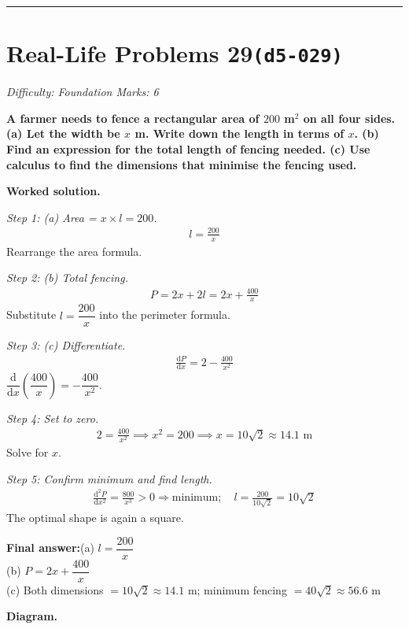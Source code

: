\documentclass[11pt]{article}
\newcommand{\question}[1]{\par\medskip\noindent\textbf{#1}\par}
\begin{document}
\medskip\hrule

\section*{Real-Life Problems 29\quad\small\texttt{(d5-029)}}
\textit{Difficulty: Foundation \quad\textbar\quad Marks: 6}

\question{A farmer needs to fence a rectangular area of \( 200 \) m\(^2\) on all four sides. (a) Let the width be \( x \) m. Write down the length in terms of \( x \). (b) Find an expression for the total length of fencing needed. (c) Use calculus to find the dimensions that minimise the fencing used.}

\textbf{Worked solution.}

\textit{Step 1: (a) Area = \( x \times l = 200 \).}
\[\begin{gathered}
l = \frac{200}{x}
\end{gathered}\]
Rearrange the area formula.

\textit{Step 2: (b) Total fencing.}
\[\begin{gathered}
P = 2x + 2l = 2x + \frac{400}{x}
\end{gathered}\]
Substitute \( l = \dfrac{200}{x} \) into the perimeter formula.

\textit{Step 3: (c) Differentiate.}
\[\begin{gathered}
\frac{\mathrm{d}P}{\mathrm{d}x} = 2 - \frac{400}{x^2}
\end{gathered}\]
\( \dfrac{\mathrm{d}}{\mathrm{d}x}\left(\dfrac{400}{x}\right) = -\dfrac{400}{x^2} \).

\textit{Step 4: Set to zero.}
\[\begin{gathered}
2 = \frac{400}{x^2} \implies x^2 = 200 \implies x = 10\sqrt{2} \approx 14.1 \text{ m}
\end{gathered}\]
Solve for \( x \).

\textit{Step 5: Confirm minimum and find length.}
\[\begin{gathered}
\frac{\mathrm{d}^2P}{\mathrm{d}x^2} = \frac{800}{x^3} > 0 \Rightarrow \text{minimum}; \quad l = \frac{200}{10\sqrt{2}} = 10\sqrt{2}
\end{gathered}\]
The optimal shape is again a square.

\begin{answerbox}
\textbf{Final answer:}\quad (a) \(\displaystyle  l = \dfrac{200}{x} \) \\[3pt]  (b) \(\displaystyle  P = 2x + \dfrac{400}{x} \) \\[3pt]  (c) Both dimensions \(\displaystyle  = 10\sqrt{2} \approx 14.1 \) m; minimum fencing \(\displaystyle  = 40\sqrt{2} \approx 56.6 \) m
\end{answerbox}
\textbf{Diagram.}
\end{document}
